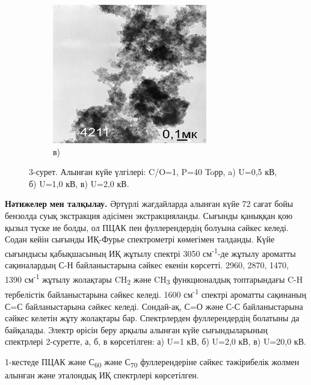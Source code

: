 \begin{figure}[H]
\begin{subfigure}[b]{0.32\textwidth}
        \centering
        \includegraphics[width=\textwidth]{assets/31}
        \caption*{в)}
    \end{subfigure}
    \caption*{3-сурет. Алынған күйе үлгілері: C/O=1, P=40 Toрр, a) U=0,5 кВ, б) U=1,0 кВ, в) U=2,0 кВ.}
\end{figure}

\begin{multicols}{2}
{\bfseries Нәтижелер} {\bfseries мен талқылау.} Әртүрлі жағдайларда алынған
күйе 72 сағат бойы бензолда суық экстракция әдісімен экстракцияланды.
Сығынды қаныққан қою қызыл түске ие болды, ол ПЦАК пен фуллерендердің
болуына сәйкес келеді. Содан кейін сығынды ИҚ-Фурье спектрометрі
көмегімен талданды. Күйе сығындысы қабықшасының ИҚ жұтылу спектрі 3050
см\textsuperscript{-1}-де жұтылу ароматты сақиналардың С-Н
байланыстарына сәйкес екенін көрсетті. 2960, 2870, 1470, 1390
см\textsuperscript{-1} жұтылу жолақтары CH\textsubscript{2} және
CH\textsubscript{3} функционалдық топтарындағы C-H тербелістік
байланыстарына сәйкес келеді. 1600 см\textsuperscript{-1} спектрі
ароматты сақинаның С=С байланыстарына сәйкес келеді. Сондай-ақ, С=О және
С-С байланыстарына сәйкес келетін жұту жолақтары бар. Спектрлерден
фуллерендердің болатыны да байқалады. Электр өрісін беру арқылы алынған
күйе сығындыларының спектрлері 2-суретте, а, б, в көрсетілген: а) U=1
кВ, б) U=2,0 кВ, в) U=20,0 кВ.

1-кестеде ПЦАК және С\textsubscript{60} және С\textsubscript{70}
фуллерендеріне сәйкес тәжірибелік жолмен алынған және эталондық ИҚ
спектрлері көрсетілген.
\end{multicols}

